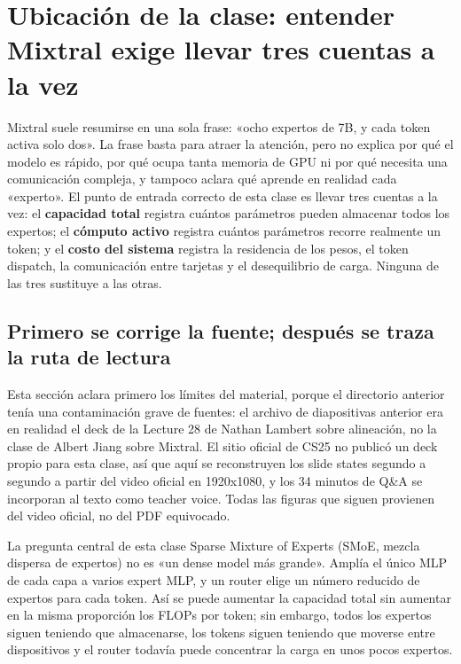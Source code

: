 \section{Ubicación de la clase: entender Mixtral exige llevar tres cuentas a la vez}

Mixtral suele resumirse en una sola frase: «ocho expertos de 7B, y cada token activa solo dos». La frase basta para atraer la atención, pero no explica por qué el modelo es rápido, por qué ocupa tanta memoria de GPU ni por qué necesita una comunicación compleja, y tampoco aclara qué aprende en realidad cada «experto». El punto de entrada correcto de esta clase es llevar tres cuentas a la vez: el \textbf{capacidad total} registra cuántos parámetros pueden almacenar todos los expertos; el \textbf{cómputo activo} registra cuántos parámetros recorre realmente un token; y el \textbf{costo del sistema} registra la residencia de los pesos, el token dispatch, la comunicación entre tarjetas y el desequilibrio de carga. Ninguna de las tres sustituye a las otras.

\subsection{Primero se corrige la fuente; después se traza la ruta de lectura}

Esta sección aclara primero los límites del material, porque el directorio anterior tenía una contaminación grave de fuentes: el archivo de diapositivas anterior era en realidad el deck de la Lecture 28 de Nathan Lambert sobre alineación, no la clase de Albert Jiang sobre Mixtral. El sitio oficial de CS25 no publicó un deck propio para esta clase, así que aquí se reconstruyen los slide states segundo a segundo a partir del video oficial en 1920x1080, y los 34 minutos de Q\&A se incorporan al texto como teacher voice. Todas las figuras que siguen provienen del video oficial, no del PDF equivocado.


\begin{importantbox}{La pregunta central de esta clase}
Sparse Mixture of Experts (SMoE, mezcla dispersa de expertos) no es «un dense model más grande». Amplía el único MLP de cada capa a varios expert MLP, y un router elige un número reducido de expertos para cada token. Así se puede aumentar la capacidad total sin aumentar en la misma proporción los FLOPs por token; sin embargo, todos los expertos siguen teniendo que almacenarse, los tokens siguen teniendo que moverse entre dispositivos y el router todavía puede concentrar la carga en unos pocos expertos.
\end{importantbox}


